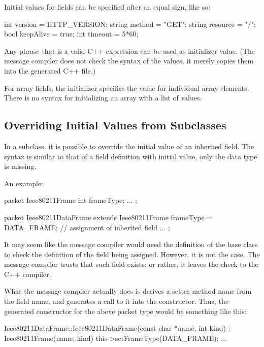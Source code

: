 Initial values for fields can be specified after an equal sign, like so:

\begin{msg}
int version = HTTP_VERSION;
string method = "GET";
string resource = "/";
bool keepAlive = true;
int timeout = 5*60;
\end{msg}

Any phrase that is a valid C++ expression can be used as initializer value. (The
message compiler does not check the syntax of the values, it merely copies them
into the generated C++ file.)

For array fields, the initializer specifies the value for individual array
elements. There is no syntax for initializing an array with a list of values.


\subsection{Overriding Initial Values from Subclasses}
\label{sec:msg-defs:assignment-of-inherited-fields}

In a subclass, it is possible to override the initial value of an inherited
field. The syntax is similar to that of a field definition with initial value,
only the data type is missing.

An example:

\begin{msg}
packet Ieee80211Frame
{
    int frameType;
    ...
};

packet Ieee80211DataFrame extends Ieee80211Frame
{
    frameType = DATA_FRAME;  // assignment of inherited field
    ...
};
\end{msg}

It may seem like the message compiler would need the definition of the base
class to check the definition of the field being assigned. However, it is
not the case. The message compiler trusts that such field exists; or
rather, it leaves the check to the C++ compiler.

What the message compiler actually does is derives a setter method name
from the field name, and generates a call to it into the constructor.
Thus, the generated constructor for the above packet type would be
something like this:

\begin{cpp}
Ieee80211DataFrame::Ieee80211DataFrame(const char *name, int kind) :
    Ieee80211Frame(name, kind)
{
    this->setFrameType(DATA_FRAME);
    ...
}
\end{cpp}

